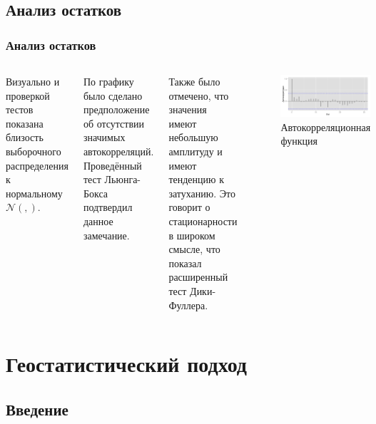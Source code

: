 \documentclass[10pt,pdf,aspectratio=169,hyperref={unicode}]{beamer}
\newcommand{\inp}[1]{}
\newcommand{\descriptive}[2]{\inp{#1/descriptive/#2}}
\newcommand{\resnormaldistr}{$\mathcal{N}(\descriptive{residual}{mean}, \descriptive{residual}{variance})$}
\begin{document}
\subsection{Анализ остатков}
\begin{frame}
  \frametitle{Анализ остатков}
  \begin{columns}[c]
  \column{2.5in}
    Визуально и проверкой тестов показана близость выборочного распределения к нормальному \resnormaldistr.

    \vspace{0.5em}

    По графику было сделано предположение об отсутствии значимых автокорреляций. Проведённый тест Льюнга-Бокса подтвердил данное замечание.

    \vspace{0.5em}

    Также было отмечено, что значения имеют небольшую амплитуду и имеют тенденцию к затуханию. Это говорит о стационарности в широком смысле, что показал расширенный тест Дики-Фуллера.
  \column{3.5in}
    \begin{figure}[h]
    \includegraphics[width=1\linewidth]{../../figures/residual/acf.png}
    \caption{Автокорреляционная функция}
  \end{figure}
  \end{columns}
\end{frame}

\section{Геостатистический подход}

\subsection{Введение}
\end{document}
